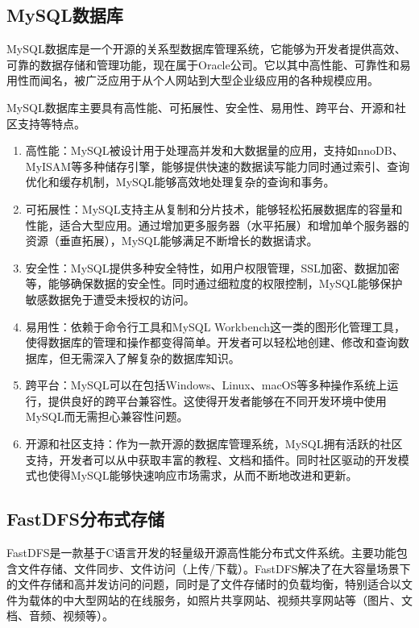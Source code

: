 \subsection{MySQL数据库}

MySQL数据库是一个开源的关系型数据库管理系统，它能够为开发者提供高效、可靠的数据存储和管理功能，现在属于Oracle公司。它以其中高性能、可靠性和易用性而闻名，被广泛应用于从个人网站到大型企业级应用的各种规模应用。

MySQL数据库主要具有高性能、可拓展性、安全性、易用性、跨平台、开源和社区支持等特点。\cite{RN04}
\begin{enumerate}[label=(\arabic*)]
    \item 高性能：MySQL被设计用于处理高并发和大数据量的应用，支持如nnoDB、MyISAM等多种储存引擎，能够提供快速的数据读写能力同时通过索引、查询优化和缓存机制，MySQL能够高效地处理复杂的查询和事务。
    \item 可拓展性：MySQL支持主从复制和分片技术，能够轻松拓展数据库的容量和性能，适合大型应用。通过增加更多服务器（水平拓展）和增加单个服务器的资源（垂直拓展），MySQL能够满足不断增长的数据请求。
    \item 安全性：MySQL提供多种安全特性，如用户权限管理，SSL加密、数据加密等，能够确保数据的安全性。同时通过细粒度的权限控制，MySQL能够保护敏感数据免于遭受未授权的访问。
    \item 易用性：依赖于命令行工具和MySQL Workbench这一类的图形化管理工具，使得数据库的管理和操作都变得简单。开发者可以轻松地创建、修改和查询数据库，但无需深入了解复杂的数据库知识。
    \item 跨平台：MySQL可以在包括Windows、Linux、macOS等多种操作系统上运行，提供良好的跨平台兼容性。这使得开发者能够在不同开发环境中使用MySQL而无需担心兼容性问题。
    \item 开源和社区支持：作为一款开源的数据库管理系统，MySQL拥有活跃的社区支持，开发者可以从中获取丰富的教程、文档和插件。同时社区驱动的开发模式也使得MySQL能够快速响应市场需求，从而不断地改进和更新。
\end{enumerate}

\subsection{FastDFS分布式存储}

FastDFS是一款基于C语言开发的轻量级开源高性能分布式文件系统。主要功能包含文件存储、文件同步、文件访问（上传/下载）。FastDFS解决了在大容量场景下的文件存储和高并发访问的问题，同时是了文件存储时的负载均衡，特别适合以文件为载体的中大型网站的在线服务，如照片共享网站、视频共享网站等（图片、文档、音频、视频等）。\cite{RN05}

